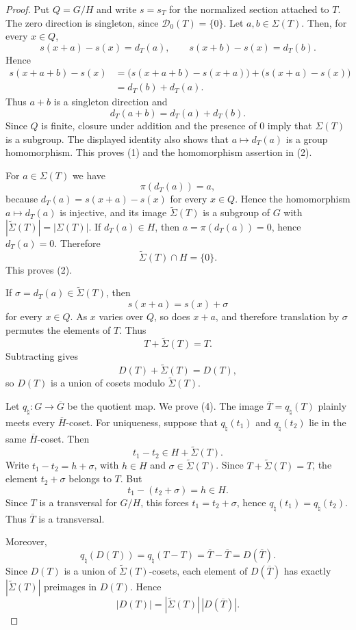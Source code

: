 \documentclass[10pt,a4paper]{amsart}
\begin{document}
\begin{proof}
Put $Q=G/H$ and write $s=s_T$ for the normalized section attached to $T$.
The zero direction is singleton, since $\mathcal D_0(T)=\{0\}$.  Let
$a,b\in\Sigma(T)$.  Then, for every $x\in Q$,
\[
  s(x+a)-s(x)=d_T(a),
  \qquad
  s(x+b)-s(x)=d_T(b).
\]
Hence
\[
\begin{aligned}
  s(x+a+b)-s(x)
  &=\bigl(s(x+a+b)-s(x+a)\bigr)+\bigl(s(x+a)-s(x)\bigr) \\
  &=d_T(b)+d_T(a).
\end{aligned}
\]
Thus $a+b$ is a singleton direction and
\[
  d_T(a+b)=d_T(a)+d_T(b).
\]
Since $Q$ is finite, closure under addition and the presence of $0$ imply that
$\Sigma(T)$ is a subgroup.  The displayed identity also shows that
$a\mapsto d_T(a)$ is a group homomorphism.  This proves (1) and the homomorphism
assertion in (2).

For $a\in\Sigma(T)$ we have
\[
  \pi(d_T(a))=a,
\]
because $d_T(a)=s(x+a)-s(x)$ for every $x\in Q$.  Hence the homomorphism
$a\mapsto d_T(a)$ is injective, and its image $\widetilde\Sigma(T)$ is a
subgroup of $G$ with $|\widetilde\Sigma(T)|=|\Sigma(T)|$.  If
$d_T(a)\in H$, then $a=\pi(d_T(a))=0$, hence $d_T(a)=0$.  Therefore
\[
  \widetilde\Sigma(T)\cap H=\{0\}.
\]
This proves (2).

If $\sigma=d_T(a)\in\widetilde\Sigma(T)$, then
\[
  s(x+a)=s(x)+\sigma
\]
for every $x\in Q$.  As $x$ varies over $Q$, so does $x+a$, and therefore
translation by $\sigma$ permutes the elements of $T$.  Thus
\[
  T+\widetilde\Sigma(T)=T.
\]
Subtracting gives
\[
  D(T)+\widetilde\Sigma(T)=D(T),
\]
so $D(T)$ is a union of cosets modulo $\widetilde\Sigma(T)$.

Let $q_{\natural}:G\to\overline G$ be the quotient map.  We prove (4).  The
image $\overline T=q_{\natural}(T)$ plainly meets every
$\overline H$-coset.  For uniqueness, suppose that $q_{\natural}(t_1)$ and
$q_{\natural}(t_2)$ lie in the same $\overline H$-coset.  Then
\[
  t_1-t_2\in H+\widetilde\Sigma(T).
\]
Write $t_1-t_2=h+\sigma$, with $h\in H$ and
$\sigma\in\widetilde\Sigma(T)$.  Since $T+\widetilde\Sigma(T)=T$, the element
$t_2+\sigma$ belongs to $T$.  But
\[
  t_1-(t_2+\sigma)=h\in H.
\]
Since $T$ is a transversal for $G/H$, this forces $t_1=t_2+\sigma$, hence
$q_{\natural}(t_1)=q_{\natural}(t_2)$.  Thus $\overline T$ is a transversal.

Moreover,
\[
  q_{\natural}(D(T))=q_{\natural}(T-T)=\overline T-\overline T=D(\overline T).
\]
Since $D(T)$ is a union of $\widetilde\Sigma(T)$-cosets, each element of
$D(\overline T)$ has exactly $|\widetilde\Sigma(T)|$ preimages in $D(T)$.  Hence
\[
  |D(T)|=|\widetilde\Sigma(T)|\,|D(\overline T)|.
\]


\end{proof}
\end{document}
